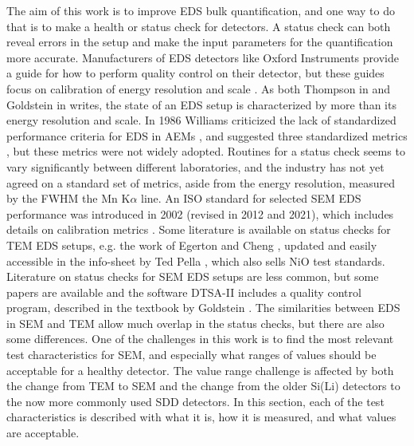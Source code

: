 The aim of this work is to improve EDS bulk quantification, and one way to do that is to make a health or status check for detectors.
A status check can both reveal errors in the setup and make the input parameters for the quantification more accurate.
Manufacturers of EDS detectors like Oxford Instruments provide a guide for how to perform quality control on their detector, but these guides focus on calibration of energy resolution and scale \cite{aztec_manual}.
As both Thompson in \cite{keith_energy_res_2013} and Goldstein in \cite{goldstein_scanning_2018} writes, the state of an EDS setup is characterized by more than its energy resolution and scale.
In 1986 Williams criticized the lack of standardized performance criteria for EDS in AEMs , and suggested three standardized metrics \cite{williams_standard_definitions_1986}, but these metrics were not widely adopted.
Routines for a status check seems to vary significantly between different laboratories, and the industry has not yet agreed on a standard set of metrics, aside from the energy resolution, measured by the FWHM the Mn K$\alpha$ line.
An ISO standard for selected SEM EDS performance was introduced in 2002 (revised in 2012 and 2021), which includes details on calibration metrics \cite{iso_qc_15632}.
Some literature is available on status checks for TEM EDS setups, e.g. the work of Egerton and Cheng \cite{egerton_nio_characterization_1994}, updated and easily accessible in the info-sheet by Ted Pella \cite{ted_pella_nio_tem_2019}, which also sells NiO test standards.
Literature on status checks for SEM EDS setups are less common, but some papers are available and the software DTSA-II \cite{software_dtsaii} includes a quality control program, described in the textbook by Goldstein \cite{goldstein_scanning_2018}.
The similarities between EDS in SEM and TEM allow much overlap in the status checks, but there are also some differences.
One of the challenges in this work is to find the most relevant test characteristics for SEM, and especially what ranges of values should be acceptable for a healthy detector.
The value range challenge is affected by both the change from TEM to SEM and the change from the older Si(Li) detectors to the now more commonly used SDD detectors.
In this section, each of the test characteristics is described with what it is, how it is measured, and what values are acceptable.

